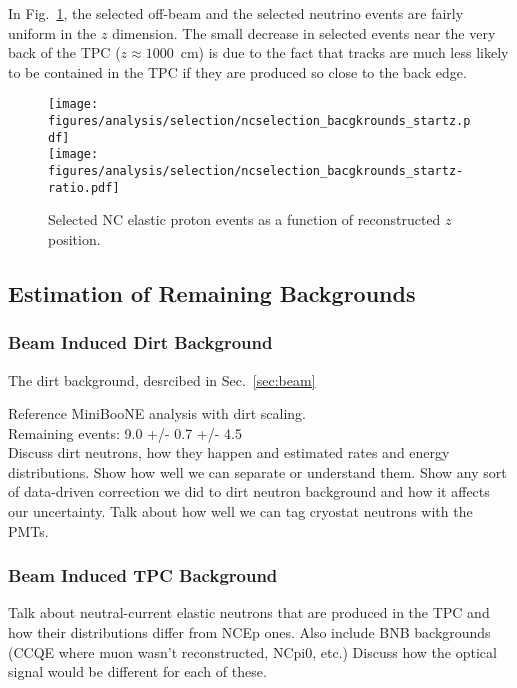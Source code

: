     In Fig.~\ref{fig:ncestartz}, the selected off-beam and the selected
    neutrino events are fairly uniform in the $z$ dimension. The small decrease
    in selected events near the very back of the TPC ($z \approx 1000$~cm) is
    due to the fact that tracks are much less likely to be contained in the TPC
    if they are produced so close to the back edge.
    \begin{figure}[ht]
      \centering
      \texttt{[image: figures/analysis/selection/ncselection\_bacgkrounds\_startz.pdf]} \\
      \texttt{[image: figures/analysis/selection/ncselection\_bacgkrounds\_startz-ratio.pdf]} \\
      \caption{Selected NC elastic proton events as a function of reconstructed $z$ position.}
      \label{fig:ncestartz}
    \end{figure}

    \FloatBarrier

\subsection{Estimation of Remaining Backgrounds}\label{sec:effbg}
  \subsubsection{Beam Induced Dirt Background}\label{sec:dirt}
    The dirt background, desrcibed in Sec.~\ref{sec:beam}

    Reference MiniBooNE analysis with dirt scaling. \\
    Remaining events: 9.0 +/- 0.7 +/- 4.5 \\

    Discuss dirt neutrons, how they happen and estimated rates and energy
    distributions.  Show how well we can separate or understand them. Show any
    sort of data-driven correction we did to dirt neutron background and how it
    affects our uncertainty. Talk about how well we can tag cryostat neutrons
    with the PMTs.
  \subsubsection{Beam Induced TPC Background}
    Talk about neutral-current elastic neutrons that are produced in the TPC
    and how their distributions differ from NCEp ones. Also include BNB
    backgrounds (CCQE where muon wasn't reconstructed, NCpi0, etc.) Discuss how
    the optical signal would be different for each of these.
